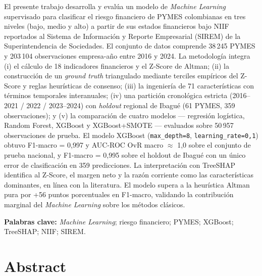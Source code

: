 \documentclass[12pt, letterpaper]{article}
\newcommand{\zaltscore}{Z\textquotesingle\textquotesingle-Score}
\begin{document}
El presente trabajo desarrolla y eval\'ua un modelo de \textit{Machine Learning} supervisado para clasificar el riesgo financiero de PYMES colombianas en tres niveles (bajo, medio y alto) a partir de sus estados financieros bajo NIIF reportados al Sistema de Informaci\'on y Reporte Empresarial (SIREM) de la Superintendencia de Sociedades. El conjunto de datos comprende 38\,245 PYMES y 203\,104 observaciones empresa-a\~no entre 2016 y 2024. La metodolog\'ia integra (i) el c\'alculo de 18 indicadores financieros y el \zaltscore{} de Altman; (ii) la construcci\'on de un \textit{ground truth} triangulado mediante terciles emp\'iricos del Z-Score y reglas heur\'isticas de consenso; (iii) la ingenier\'ia de 71 caracter\'isticas con t\'erminos temporales interanuales; (iv) una partici\'on cronol\'ogica estricta (2016--2021 / 2022 / 2023--2024) con \textit{holdout} regional de Ibagu\'e (61 PYMES, 359 observaciones); y (v) la comparaci\'on de cuatro modelos --- regresi\'on log\'istica, Random Forest, XGBoost y XGBoost+SMOTE --- evaluados sobre 50\,957 observaciones de prueba. El modelo XGBoost (\texttt{max\_depth=8}, \texttt{learning\_rate=0,1}) obtuvo F1-macro = 0,997 y AUC-ROC OvR macro $\approx$ 1,0 sobre el conjunto de prueba nacional, y F1-macro = 0,995 sobre el holdout de Ibagu\'e con un \'unico error de clasificaci\'on en 359 predicciones. La interpretaci\'on con TreeSHAP identifica al \zaltscore{}, el margen neto y la raz\'on corriente como las caracter\'isticas dominantes, en l\'inea con la literatura. El modelo supera a la heur\'istica Altman pura por +56 puntos porcentuales en F1-macro, validando la contribuci\'on marginal del \textit{Machine Learning} sobre los m\'etodos cl\'asicos.

\vspace{0.6em}
\noindent\textbf{Palabras clave:} \emph{Machine Learning}; riesgo financiero; PYMES; XGBoost; TreeSHAP; NIIF; SIREM.

\section*{Abstract}
\end{document}
